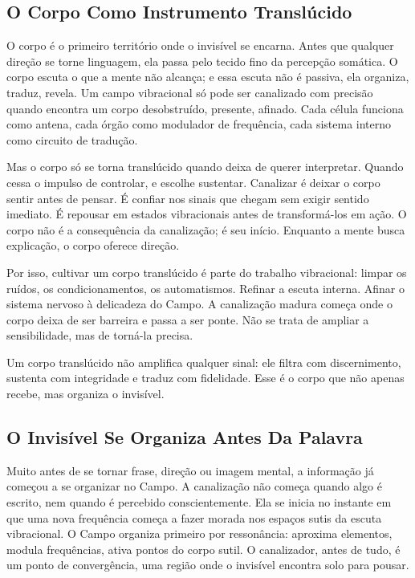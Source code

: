 \documentclass[12pt]{book}
\begin{document}
\subsection*{O Corpo Como Instrumento Translúcido}

O corpo é o primeiro território onde o invisível se encarna. Antes que qualquer direção se torne linguagem, ela passa pelo tecido fino da percepção somática. O corpo escuta o que a mente não alcança; e essa escuta não é passiva, ela organiza, traduz, revela. Um campo vibracional só pode ser canalizado com precisão quando encontra um corpo desobstruído, presente, afinado. Cada célula funciona como antena, cada órgão como modulador de frequência, cada sistema interno como circuito de tradução.

Mas o corpo só se torna translúcido quando deixa de querer interpretar. Quando cessa o impulso de controlar, e escolhe sustentar. Canalizar é deixar o corpo sentir antes de pensar. É confiar nos sinais que chegam sem exigir sentido imediato. É repousar em estados vibracionais antes de transformá-los em ação. O corpo não é a consequência da canalização; é seu início. Enquanto a mente busca explicação, o corpo oferece direção.

Por isso, cultivar um corpo translúcido é parte do trabalho vibracional: limpar os ruídos, os condicionamentos, os automatismos. Refinar a escuta interna. Afinar o sistema nervoso à delicadeza do Campo. A canalização madura começa onde o corpo deixa de ser barreira e passa a ser ponte. Não se trata de ampliar a sensibilidade, mas de torná-la precisa.

Um corpo translúcido não amplifica qualquer sinal: ele filtra com discernimento, sustenta com integridade e traduz com fidelidade. Esse é o corpo que não apenas recebe, mas organiza o invisível.

\subsection*{O Invisível Se Organiza Antes Da Palavra}

Muito antes de se tornar frase, direção ou imagem mental, a informação já começou a se organizar no Campo. A canalização não começa quando algo é escrito, nem quando é percebido conscientemente. Ela se inicia no instante em que uma nova frequência começa a fazer morada nos espaços sutis da escuta vibracional. O Campo organiza primeiro por ressonância: aproxima elementos, modula frequências, ativa pontos do corpo sutil. O canalizador, antes de tudo, é um ponto de convergência, uma região onde o invisível encontra solo para pousar.
\end{document}
